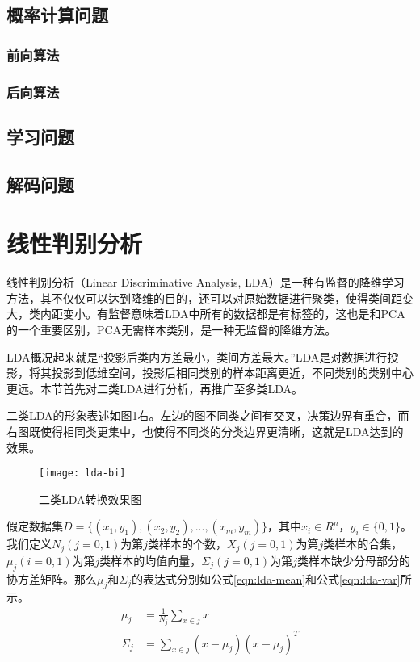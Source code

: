 \subsection{概率计算问题}
\subsubsection{前向算法}

\subsubsection{后向算法}

\subsection{学习问题}

\subsection{解码问题}


\section{线性判别分析}
线性判别分析（Linear Discriminative Analysis, LDA）是一种有监督的降维学习方法，其不仅仅可以达到降维的目的，还可以对原始数据进行聚类，使得类间距变大，类内距变小。有监督意味着LDA中所有的数据都是有标签的，这也是和PCA的一个重要区别，PCA无需样本类别，是一种无监督的降维方法。

LDA概况起来就是“投影后类内方差最小，类间方差最大。”LDA是对数据进行投影，将其投影到低维空间，投影后相同类别的样本距离更近，不同类别的类别中心更远。本节首先对二类LDA进行分析，再推广至多类LDA。

二类LDA的形象表述如图\ref{fig:lda-bi}右。左边的图不同类之间有交叉，决策边界有重合，而右图既使得相同类更集中，也使得不同类的分类边界更清晰，这就是LDA达到的效果。
\begin{figure}[htbp]
  \centering
  \texttt{[image: lda-bi]}
  \caption{二类LDA转换效果图 \label{fig:lda-bi}}
\end{figure}

假定数据集$D=\{(x_1, y_1), (x_2, y_2), ..., (x_m, y_m)\}$，其中$x_i \in R^{n}$，$y_i \in \{0, 1\}$。我们定义$N_j (j=0,1)$为第$j$类样本的个数，$X_j (j=0,1)$为第$j$类样本的合集，$\mu_j (i=0,1)$为第$j$类样本的均值向量，$\Sigma_j (j=0,1)$为第$j$类样本缺少分母部分的协方差矩阵。那么$\mu_j$和$\Sigma_j$的表达式分别如公式\ref{eqn:lda-mean}和公式\ref{eqn:lda-var}所示。
\begin{align}
\mu_j &= \frac{1}{N_j} \sum_{x\in{j}} x  \label{eqn:lda-mean}\\
\Sigma_j &= \sum_{x\in{j}} (x-\mu_{j})(x-\mu_{j})^{T} \label{eqn:lda-var}
\end{align}

